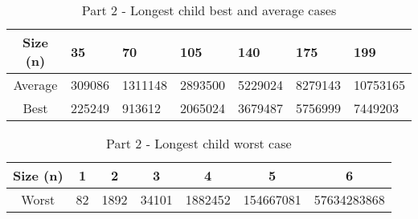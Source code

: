 \usepackage{array}

\begin{table}[h!]
\begin{center}
\begin{tabular}{|c|m{1cm}|m{1cm}|m{1cm}|m{1cm}|m{1cm}|m{1.2cm}|} 
 \hline
 Size (n) & 35 & 70 & 105 & 140 & 175 & 199 \\
 \hline\hline
 Average & 309086 & 1311148 & 2893500 & 5229024 & 8279143 & 10753165 \\
 \hline
 Best & 225249 & 913612 & 2065024 & 3679487 & 5756999 & 7449203 \\
 \hline
\end{tabular}
\label{path_table}
\caption{Part 2 - Longest child best and average cases}
\end{center}
\end{table}

\begin{table}[h!]
\begin{center}
\begin{tabular}{|c|c|c|c|c|c|c|}
 \hline
 Size (n) & 1 & 2 & 3 & 4 & 5 & 6 \\
 \hline\hline
 Worst & 82 & 1892 & 34101 & 1882452 & 154667081 & 57634283868 \\
 \hline
\end{tabular}
\label{path_table_worst}
\caption{Part 2 - Longest child worst case}
\end{center}
\end{table}

